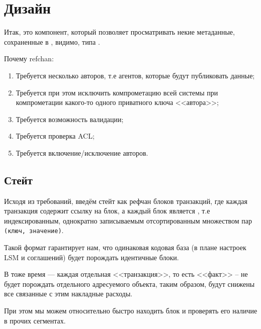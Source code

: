 
\chapter{Дизайн}


Итак,  это компонент, который позволяет
просматривать некие метаданные, сохраненные в , видимо,
типа .

Почему refchan:

\begin{enumerate}
  \item Требуется несколько авторов, т.е агентов,
        которые будут публиковать данные;
  \item Требуется при этом исключить компрометацию всей
        системы при компрометации какого-то одного приватного ключа <<автора>>;
  \item Требуется возможность валидации;
  \item Требуется проверка ACL;
  \item Требуется включение/исключение авторов.
\end{enumerate}

\section{Стейт}

Исходя из требований, введём стейт как рефчан блоков транзакций, где каждая транзакция содержит
ссылку на блок, а каждый блок является , т.е индексированным, однократно
записываемым отсортированным множеством пар \texttt{(ключ, значение)}.

Такой формат гарантирует нам, что одинаковая кодовая база (в плане настроек LSM и соглашений) будет
порождать идентичные блоки.

В тоже время --- каждая отдельная <<транзакция>>, то есть <<факт>> -- не будет порождать отдельного
адресуемого объекта, таким образом, будут снижены все связанные с этим накладные расходы.

При этом мы можем относительно быстро находить блок и проверять его наличие в прочих сегментах.





